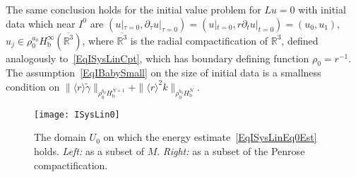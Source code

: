 \documentclass[reqno,11pt,letterpaper]{amsart}
\numberwithin{equation}{section}
\numberwithin{figure}{section}
\theoremstyle{definition}
\theoremstyle{remark}
\newcommand{\R}{\mathbb{R}}
\newcommand{\la}{\langle}
\newcommand{\ol}{\overline}
\newcommand{\pa}{\partial}
\newcommand{\ra}{\rangle}
\newcommand{\wt}{\widetilde}
\newcommand{\bop}{{\mathrm{b}}}
\newcommand{\Hb}{H_{\bop}}
\begin{document}
The same conclusion holds for the initial value problem for $L u=0$ with initial data which near $I^0$ are $(u|_{\tau=0},\pa_\tau u|_{\tau=0})=(u|_{t=0},r \pa_t u|_{t=0})=(u_0,u_1)$, $u_j\in\rho_0^{a_0}\Hb^\infty(\ol{\R^3})$, where $\ol{\R^3}$ is the radial compactification of $\R^3$, defined analogously to~\eqref{EqISysLinCpt}, which has boundary defining function $\rho_0=r^{-1}$. The assumption~\eqref{EqIBabySmall} on the size of initial data is a smallness condition on $\|\la r\ra\wt\gamma\|_{\rho_0^{b_0}\Hb^{N+1}}+\|\la r\ra^2 k\|_{\rho_0^{b_0}\Hb^N}$.

\begin{figure}[!ht]
\texttt{[image: ISysLin0]}
\caption{The domain $U_0$ on which the energy estimate~\eqref{EqISysLinEq0Est} holds. \textit{Left:} as a subset of $M$. \textit{Right:} as a subset of the Penrose compactification.}
\label{FigISysLin0}
\end{figure}
\end{document}
